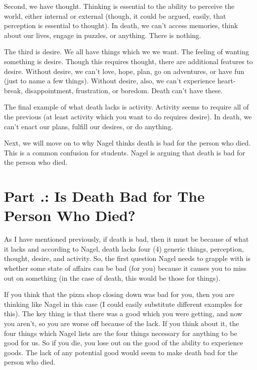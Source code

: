 Second, we have thought. Thinking is essential to the ability to perceive the world, either internal or external (though, it could be argued, easily, that perception is essential to thought). In death, we can't access memories, think about our lives, engage in puzzles, or anything. There is nothing.

The third is desire. We all have things which we we want. The feeling of wanting something is desire. Though this requires thought, there are additional features to desire. Without desire, we can't love, hope, plan, go on adventures, or have fun (just to name a few things). Without desire, also, we can't experience heart-break, disappointment, frustration, or boredom. Death can't have these.

The final example of what death lacks is activity. Activity seems to require all of the previous (at least activity which you want to do requires desire). In death, we can't enact our plans, fulfill our desires, or do anything.

Next, we will move on to why Nagel thinks death is bad for the person who died. This is a common confusion for students. Nagel is arguing that death is bad for the person who died. 

\section{Part \thechapcount.\theseccount:  Is Death Bad for The Person Who Died?}

As I have mentioned previously, if death is bad, then it must be because of what it lacks and according to Nagel, death lacks four (4) generic things, perception, thought, desire, and activity. So, the first question Nagel needs to grapple with is whether some state of affairs can be bad (for you) because it causes you to miss out on something (in the case of death, this would be those for things).


If you think that the pizza shop closing down was bad for you, then you are thinking like Nagel in this case (I could easily substitute different examples for this). The key thing is that there was a good which you were getting, and now you aren't, so you are worse off because of the lack. If you think about it, the four things which Nagel lists are the four things necessary for anything to be good for us. So if you die, you lose out on the good of the ability to experience goods. The lack of any potential good would seem to make death bad for the person who died. 

